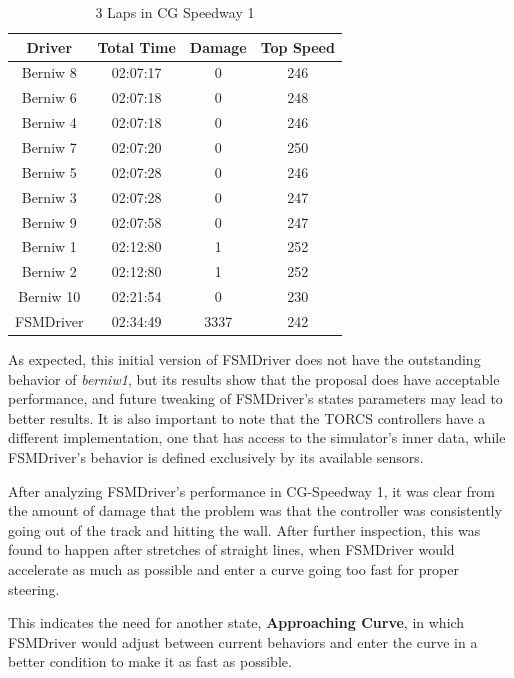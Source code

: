 \begin{table}[h]
\renewcommand{\arraystretch}{1.3}
\caption{ 3 Laps in CG Speedway 1}
\label{tbl:berniw_CG}
\centering

\begin{tabular}{c||c||c||c}
\hline \bfseries Driver &\bfseries Total Time &\bfseries Damage &\bfseries Top Speed \\
\hline
\hline Berniw 8 & 02:07:17 & 0 & 246 \\
\hline Berniw 6 & 02:07:18 & 0 & 248 \\
\hline Berniw 4 & 02:07:18 & 0 & 246 \\
\hline Berniw 7 & 02:07:20 & 0 & 250 \\
\hline Berniw 5 & 02:07:28 & 0 & 246 \\
\hline Berniw 3 & 02:07:28 & 0 & 247 \\
\hline Berniw 9 & 02:07:58 & 0 & 247 \\
\hline Berniw 1 & 02:12:80 & 1 & 252 \\
\hline Berniw 2 & 02:12:80 & 1 & 252 \\
\hline Berniw 10 & 02:21:54 & 0 & 230 \\
\hline FSMDriver & 02:34:49 & 3337 & 242 \\ 
\hline 
\end{tabular}
\end{table}

As expected, this initial version of FSMDriver does not have the outstanding 
behavior of \emph{berniw1}, but its results show that the proposal does have
acceptable performance, and future tweaking of FSMDriver's states parameters may
lead to better results. It is also important to note that the TORCS controllers
have a different implementation, one that has access to the simulator's inner data,
while FSMDriver's behavior is defined exclusively by its available sensors.

After analyzing FSMDriver's performance in CG-Speedway 1, it was clear from the
amount of damage that the problem was that the controller was consistently going
out of the track and hitting the wall. After further inspection, this was found 
to happen after stretches of straight lines, when FSMDriver would accelerate as 
much as possible and enter a curve going too fast for proper steering.

This indicates the need for another state, \textbf{Approaching Curve}, in which 
FSMDriver would adjust between current behaviors and enter the curve in a better
condition to make it as fast as possible.